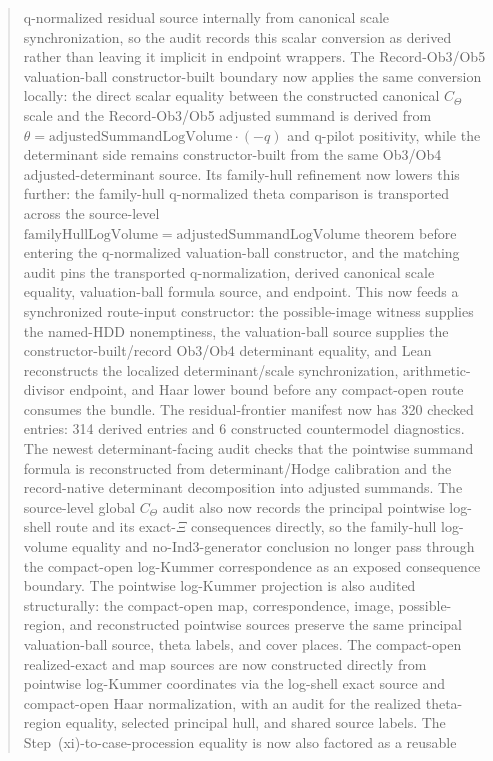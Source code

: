 \documentclass[11pt]{article}
\theoremstyle{plain}
\theoremstyle{definition}
\theoremstyle{remark}
\begin{document}
\begin{abstract}
q-normalized residual source internally from canonical scale synchronization,
so the audit records this scalar conversion as derived rather than leaving it
implicit in endpoint wrappers.  The Record-Ob3/Ob5 valuation-ball
constructor-built boundary now applies the
same conversion locally: the direct scalar equality between the constructed
canonical \(C_\Theta\) scale and the Record-Ob3/Ob5 adjusted summand is derived
from \(\theta=\mathrm{adjustedSummandLogVolume}\cdot(-q)\) and q-pilot
positivity, while the determinant side remains constructor-built from the same
Ob3/Ob4 adjusted-determinant source.  Its family-hull refinement now lowers
this further: the family-hull q-normalized theta comparison is transported
across the source-level
\(\mathrm{familyHullLogVolume}=\mathrm{adjustedSummandLogVolume}\) theorem
before entering the q-normalized valuation-ball constructor, and the matching
audit pins the transported q-normalization, derived canonical scale equality,
valuation-ball formula source, and endpoint.  This now feeds a synchronized
route-input constructor: the possible-image witness supplies the named-HDD
nonemptiness, the valuation-ball source supplies the constructor-built/record
Ob3/Ob4 determinant equality, and Lean reconstructs the localized
determinant/scale synchronization, arithmetic-divisor endpoint, and Haar
lower bound before any compact-open route consumes the bundle.  The
residual-frontier manifest now has
320 checked entries: 314 derived entries and 6 constructed countermodel
diagnostics.  The newest determinant-facing audit checks that the pointwise
summand formula is reconstructed from determinant/Hodge calibration and the
record-native determinant decomposition into adjusted summands.  The
source-level global \(C_\Theta\) audit also now records the principal
pointwise log-shell route and its exact-\(\Xi\) consequences directly, so the
family-hull log-volume equality and no-Ind3-generator conclusion no longer
pass through the compact-open log-Kummer correspondence as an exposed
consequence boundary.  The pointwise log-Kummer projection is also audited
structurally: the compact-open map, correspondence, image, possible-region, and
reconstructed pointwise sources preserve the same principal valuation-ball
source, theta labels, and cover places.  The compact-open realized-exact and
map sources are now constructed directly from pointwise log-Kummer coordinates
via the log-shell exact source and compact-open Haar normalization, with an
audit for the realized theta-region equality, selected principal hull, and
shared source labels.  The
Step~(xi)-to-case-procession equality is now also factored as a reusable

\end{abstract}
\end{document}
